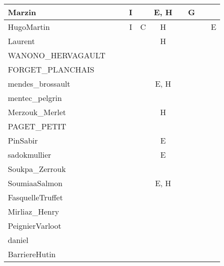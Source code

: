 \documentclass[a4paper]{article}
\begin{document}
\begin{table}[h!]
\begin{tabular}{|l|c|c|c|c|c|c|c|c|c|}
    Marzin                  &       &       & I     &       & E, H  &       & G     &       &       \\ \hline
    HugoMartin              &       &       & I     & C     & H     &       &       &       & E     \\ \hline
    Laurent                 &       &       &       &       & H     &       &       &       &       \\ \hline
    WANONO\_HERVAGAULT      &       &       &       &       &       &       &       &       &       \\ \hline
    FORGET\_PLANCHAIS       &       &       &       &       &       &       &       &       &       \\ \hline
    mendes\_brossault       &       &       &       &       & E, H  &       &       &       &       \\ \hline
    mentec\_pelgrin         &       &       &       &       &       &       &       &       &       \\ \hline
    Merzouk\_Merlet         &       &       &       &       & H     &       &       &       &       \\ \hline
    PAGET\_PETIT            &       &       &       &       &       &       &       &       &       \\ \hline
    PinSabir                &       &       &       &       & E     &       &       &       &       \\ \hline
    sadokmullier            &       &       &       &       & E     &       &       &       &       \\ \hline
    Soukpa\_Zerrouk         &       &       &       &       &       &       &       &       &       \\ \hline
    SoumiaaSalmon           &       &       &       &       & E, H  &       &       &       &       \\ \hline
    FasquelleTruffet        &       &       &       &       &       &       &       &       &       \\ \hline
    Mirliaz\_Henry          &       &       &       &       &       &       &       &       &       \\ \hline
    PeignierVarloot         &       &       &       &       &       &       &       &       &       \\ \hline
    daniel                  &       &       &       &       &       &       &       &       &       \\ \hline
    BarriereHutin           &       &       &       &       &       &       &       &       &       \\ \hline

\end{tabular}
\end{table}
\end{document}
